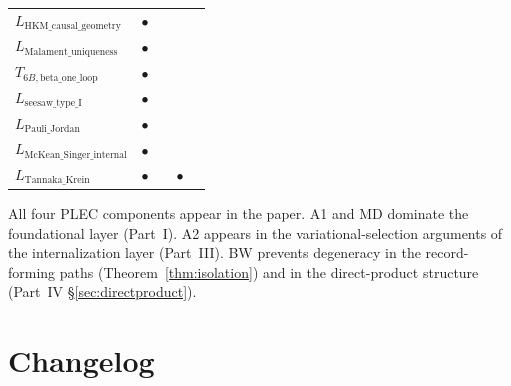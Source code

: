 \documentclass[11pt]{article}
\theoremstyle{definition}
\begin{document}
\begin{center}
\begin{tabular}{@{}lcccc@{}}
$L_{\mathrm{HKM\_causal\_geometry}}$ & $\bullet$ & & & \\
$L_{\mathrm{Malament\_uniqueness}}$ & $\bullet$ & & & \\
$T_{6B,\mathrm{beta\_one\_loop}}$ & $\bullet$ & & & \\
$L_{\mathrm{seesaw\_type\_I}}$ & $\bullet$ & & & \\
$L_{\mathrm{Pauli\_Jordan}}$ & $\bullet$ & & & \\
$L_{\mathrm{McKean\_Singer\_internal}}$ & $\bullet$ & & & \\
$L_{\mathrm{Tannaka\_Krein}}$ & $\bullet$ & & $\bullet$ & \\
\bottomrule
\end{tabular}
\end{center}

All four PLEC components appear in the paper.  A1 and MD dominate the foundational layer (Part~I).  A2 appears in the variational-selection arguments of the internalization layer (Part~III).  BW prevents degeneracy in the record-forming paths (Theorem~\ref{thm:isolation}) and in the direct-product structure (Part~IV \S\ref{sec:directproduct}).

\section{Changelog}\label{app:changelog}
\end{document}
